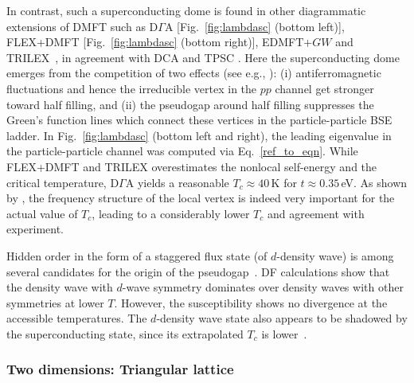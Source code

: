 \documentclass[rmp,aps,reprint,amsmath,amssymb,superscriptaddress,showpacs,nofootinbib]{revtex4-1}
\begin{document}
In contrast, such a superconducting dome is found in other diagrammatic extensions of DMFT such as D$\Gamma$A \cite{Kitatani2017} [Fig.~\ref{fig:lambdasc} (bottom left)], FLEX+DMFT  \cite{Kitatani2015} [Fig.~\ref{fig:lambdasc} (bottom right)],  EDMFT+$GW$ and TRILEX~\cite{Vucicevic2017}, in agreement with DCA \cite{Maier2005} and TPSC \cite{Kyung2003}. Here  the superconducting dome emerges from the competition of two effects (see e.g., \cite{Kitatani2017}): (i)  antiferromagnetic fluctuations and hence the irreducible vertex in the $pp$ channel get stronger toward half filling, and (ii) the pseudogap around half filling suppresses the Green's function lines which connect these vertices in the particle-particle BSE ladder. In Fig.~\ref{fig:lambdasc} (bottom left and right), the   leading eigenvalue in the particle-particle channel was computed via Eq.~\eqref{ref_to_eqn}. While FLEX+DMFT and TRILEX overestimates the nonlocal self-energy and the critical temperature, D$\Gamma$A yields a reasonable $T_{c}\approx  40\,$K for $t\approx 0.35\,$eV.  As shown by , the frequency structure of the local vertex is indeed very important for the actual value of  $T_{c}$, leading to a considerably lower  $T_{c}$ and  agreement with experiment.

Hidden order in the form of a staggered flux state (of $d$-density wave) is among  several candidates for the origin of the pseudogap~\cite{Chakravarty2001}. DF calculations show that the density wave with $d$-wave symmetry dominates over density waves with other symmetries at lower $T$. However, the susceptibility shows no divergence at the accessible temperatures. The $d$-density wave state also appears to be shadowed by the superconducting state, since its extrapolated $T_c$  is lower~\cite{Otsuki2014}.

\subsubsection{Two dimensions: Triangular lattice}
\label{sec:2dhubbtriang}
\end{document}
